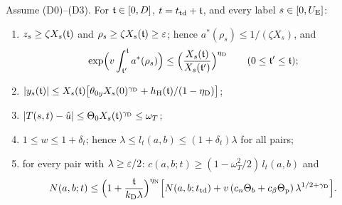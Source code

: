 \begin{theorem}[Departure]\label{thm:departure}
Assume \textup{(D0)--(D3)}. For $\mathfrak t\in[0,D]$, $t=t_{\mathrm{td}}+\mathfrak t$, and every label $s\in[0,U_{\mathrm E}]$:
\begin{enumerate}
\item[(i)] $z_s\ge\zeta X_s(\mathfrak t)$ and $\rho_s\ge\zeta X_s(\mathfrak t)\ge\varepsilon$; hence $a^*(\rho_s)\le1/(\zeta X_s)$, and
\[
\exp\Bigl(v\int_{\mathfrak t'}^{\mathfrak t}a^*(\rho_s)\Bigr)\le\Bigl(\frac{X_s(\mathfrak t)}{X_s(\mathfrak t')}\Bigr)^{\eta_{\mathrm D}}\qquad(0\le\mathfrak t'\le\mathfrak t);
\]
\item[(ii)] $|y_s(\mathfrak t)|\le X_s(\mathfrak t)\bigl[\theta_{0y}X_s(0)^{\gamma_{\mathrm D}}+h_{\mathrm H}(\mathfrak t)/(1-\eta_{\mathrm D})\bigr]$;
\item[(iii)] $|T(s,t)-\hat u|\le\Theta_0X_s(\mathfrak t)^{\gamma_{\mathrm D}}\le\omega_T$;
\item[(iv)] $1\le w\le1+\delta_t$; hence $\lambda\le l_t(a,b)\le(1+\delta_t)\lambda$ for all pairs;
\item[(v)] for every pair with $\lambda\ge\varepsilon/2$: $c(a,b;t)\ge(1-\omega_T^2/2)\,l_t(a,b)$ and
\[
N(a,b;t)\le\Bigl(1+\frac{\mathfrak t}{k_{\mathrm D}\lambda}\Bigr)^{\eta_{\mathrm N}}\Bigl[N(a,b;t_{\mathrm{td}})+v\,(c_n\Theta_b+c_\beta\Theta_{\mathrm p})\,\lambda^{1/2+\gamma_{\mathrm D}}\Bigr].
\]
\end{enumerate}
\end{theorem}

